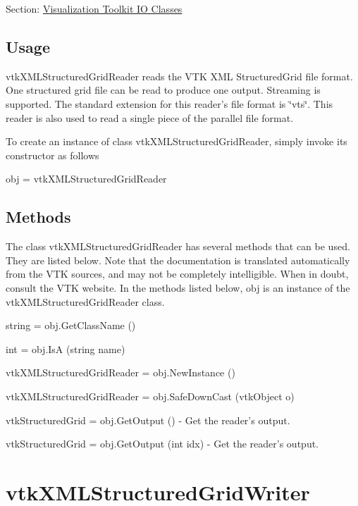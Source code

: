 Section\-: \hyperlink{sec_vtkio}{Visualization Toolkit I\-O Classes} \hypertarget{vtkwidgets_vtkxyplotwidget_Usage}{}\subsection{Usage}\label{vtkwidgets_vtkxyplotwidget_Usage}
vtk\-X\-M\-L\-Structured\-Grid\-Reader reads the V\-T\-K X\-M\-L Structured\-Grid file format. One structured grid file can be read to produce one output. Streaming is supported. The standard extension for this reader's file format is \char`\"{}vts\char`\"{}. This reader is also used to read a single piece of the parallel file format.

To create an instance of class vtk\-X\-M\-L\-Structured\-Grid\-Reader, simply invoke its constructor as follows \begin{DoxyVerb}  obj = vtkXMLStructuredGridReader
\end{DoxyVerb}
 \hypertarget{vtkwidgets_vtkxyplotwidget_Methods}{}\subsection{Methods}\label{vtkwidgets_vtkxyplotwidget_Methods}
The class vtk\-X\-M\-L\-Structured\-Grid\-Reader has several methods that can be used. They are listed below. Note that the documentation is translated automatically from the V\-T\-K sources, and may not be completely intelligible. When in doubt, consult the V\-T\-K website. In the methods listed below, {\ttfamily obj} is an instance of the vtk\-X\-M\-L\-Structured\-Grid\-Reader class. 
\begin{DoxyItemize}
\item {\ttfamily string = obj.\-Get\-Class\-Name ()}  
\item {\ttfamily int = obj.\-Is\-A (string name)}  
\item {\ttfamily vtk\-X\-M\-L\-Structured\-Grid\-Reader = obj.\-New\-Instance ()}  
\item {\ttfamily vtk\-X\-M\-L\-Structured\-Grid\-Reader = obj.\-Safe\-Down\-Cast (vtk\-Object o)}  
\item {\ttfamily vtk\-Structured\-Grid = obj.\-Get\-Output ()} -\/ Get the reader's output.  
\item {\ttfamily vtk\-Structured\-Grid = obj.\-Get\-Output (int idx)} -\/ Get the reader's output.  
\end{DoxyItemize}\hypertarget{vtkio_vtkxmlstructuredgridwriter}{}\section{vtk\-X\-M\-L\-Structured\-Grid\-Writer}\label{vtkio_vtkxmlstructuredgridwriter}
